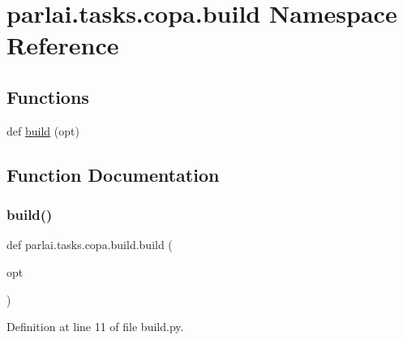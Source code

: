 \hypertarget{namespaceparlai_1_1tasks_1_1copa_1_1build}{}\section{parlai.\+tasks.\+copa.\+build Namespace Reference}
\label{namespaceparlai_1_1tasks_1_1copa_1_1build}
\subsection*{Functions}
\begin{DoxyCompactItemize}
\item 
def \hyperlink{namespaceparlai_1_1tasks_1_1copa_1_1build_a20917f15c830f6a3c2af55808ee584bf}{build} (opt)
\end{DoxyCompactItemize}


\subsection{Function Documentation}
\mbox{\label{namespaceparlai_1_1tasks_1_1copa_1_1build_a20917f15c830f6a3c2af55808ee584bf}} 
\subsubsection{\texorpdfstring{build()}{build()}}
{\footnotesize\ttfamily def parlai.\+tasks.\+copa.\+build.\+build (\begin{DoxyParamCaption}\item[{}]{opt }\end{DoxyParamCaption})}



Definition at line 11 of file build.\+py.


